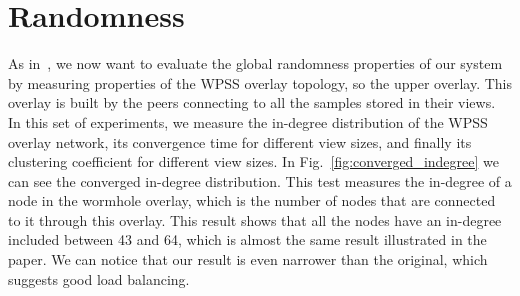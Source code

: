 \section{Randomness}
\label{sec:eval_randomness}
As in~\cite{wormhole}, we now want to evaluate the global randomness properties of our system by measuring properties of the WPSS overlay topology, so the upper overlay. This overlay is built by the peers connecting to all the samples stored in their views. In this set of experiments, we measure the in-degree distribution of the WPSS overlay network, its convergence time for different view sizes, and finally its clustering coefficient for different view sizes. In Fig.~\ref{fig:converged_indegree} we can see the converged in-degree distribution. This test measures the in-degree of a node in the wormhole overlay, which is the number of nodes that are connected to it through this overlay. This result shows that all the nodes have an in-degree included between 43 and 64, which is almost the same result illustrated in the paper. We can notice that our result is even narrower than the original, which suggests good load balancing. 

